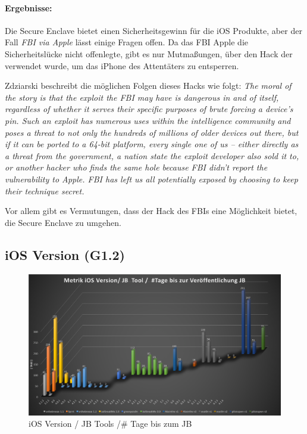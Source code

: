 \paragraph{Ergebnisse:} Die Secure Enclave bietet einen Sicherheitsgewinn für die iOS Produkte, aber der Fall \textit{\glqq FBI via Apple\grqq{}} lässt einige Fragen offen. Da das FBI Apple die Sicherheitslücke nicht offenlegte, gibt es nur Mutmaßungen, über den Hack der verwendet wurde, um das iPhone des Attentäters zu entsperren. \par 

Zdziarski beschreibt die möglichen Folgen dieses Hacks wie folgt: \textit{\glqq The moral of the story is that the exploit the FBI may have is dangerous in and of itself, regardless of whether it serves their specific purposes of brute forcing a device’s pin. Such an exploit has numerous uses within the intelligence community and poses a threat to not only the hundreds of millions of older devices out there, but if it can be ported to a 64-bit platform, every single one of us – either directly as a threat from the government, a nation state the exploit developer also sold it to, or another hacker who finds the same hole because FBI didn’t report the vulnerability to Apple. FBI has left us all potentially exposed by choosing to keep their technique secret.\grqq{}} \cite{Hacking[4]} \par 

Vor allem gibt es Vermutungen, dass der Hack des FBIs eine Möglichkeit bietet, die Secure Enclave zu umgehen.


\newpage
\subsection{iOS Version  (G1.2)}
\label{sec:Frage1iOSVersion} 

\begin{figure}[hp!]
        \centering
                \includegraphics[scale=0.38]{Bilder/Frage1_1.png}
        \caption{iOS Version / JB Tools /\# Tage bis zum JB}
        \label{fig:AnalyseiOSJB1}        
\end{figure}

